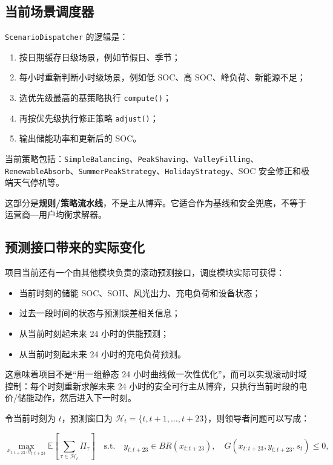 \documentclass[UTF8,a4paper,11pt]{ctexart}
\begin{document}
\subsection{当前场景调度器}

\texttt{ScenarioDispatcher} 的逻辑是：

\begin{enumerate}
  \item 按日期缓存日级场景，例如节假日、季节；
  \item 每小时重新判断小时级场景，例如低 SOC、高 SOC、峰负荷、新能源不足；
  \item 选优先级最高的基策略执行 \texttt{compute()}；
  \item 再按优先级执行修正策略 \texttt{adjust()}；
  \item 输出储能功率和更新后的 SOC。
\end{enumerate}

当前策略包括：\texttt{SimpleBalancing}、\texttt{PeakShaving}、\texttt{ValleyFilling}、\texttt{RenewableAbsorb}、\texttt{SummerPeakStrategy}、\texttt{HolidayStrategy}、SOC 安全修正和极端天气停机等。

这部分是\textbf{规则/策略流水线}，不是主从博弈。它适合作为基线和安全兜底，不等于运营商—用户均衡求解器。

\subsection{预测接口带来的实际变化}

项目当前还有一个由其他模块负责的滚动预测接口，调度模块实际可获得：

\begin{itemize}
  \item 当前时刻的储能 SOC、SOH、风光出力、充电负荷和设备状态；
  \item 过去一段时间的状态与预测误差相关信息；
  \item 从当前时刻起未来 24 小时的供能预测；
  \item 从当前时刻起未来 24 小时的充电负荷预测。
\end{itemize}

这意味着项目不是“用一组静态 24 小时曲线做一次性优化”，而可以实现滚动时域控制：每个时刻重新求解未来 24 小时的安全可行主从博弈，只执行当前时段的电价/储能动作，然后进入下一时刻。

令当前时刻为 $t$，预测窗口为 $\mathcal{H}_t=\{t,t+1,\ldots,t+23\}$，则领导者问题可以写成：

\begin{equation}
\max_{x_{t:t+23},y_{t:t+23}}
\mathbb{E}\left[\sum_{\tau\in\mathcal{H}_t} \Pi_\tau\right]
\quad\text{s.t.}\quad
y_{t:t+23}\in BR(x_{t:t+23}),\quad
G(x_{t:t+23},y_{t:t+23},s_t)\le 0,
\end{equation}
\end{document}
